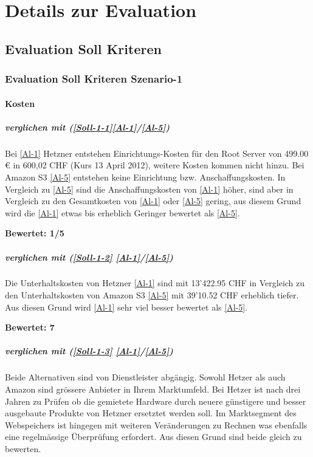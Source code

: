 \cleardoublepage
\chapter{Details zur Evaluation}
\section{Evaluation Soll Kriteren}
\subsection{Evaluation Soll Kriteren Szenario-1}

\subsubsection{Kosten}

\paragraph*{  verglichen mit  (\ref{Soll-1-1}\ref{Al-1}/\ref{Al-5})}
Bei \ref{Al-1} Hetzner entstehen Einrichtungs-Kosten für den Root Server von 499.00 € in 600,02 CHF (Kurs 13 April 2012), weitere Kosten kommen nicht hinzu. Bei Amazon S3 \ref{Al-5} entstehen keine Einrichtung bzw. Anschaffungskosten. In Vergleich zu \ref{Al-5} sind die Anschaffungskosten von \ref{Al-1} höher, sind aber in Vergleich zu den Gesamtkosten von \ref{Al-1} oder \ref{Al-5} gering, aus diesem Grund wird die \ref{Al-1} etwas bis erheblich Geringer bewertet als \ref{Al-5}.

\textbf{Bewertet: 1/5}

\paragraph*{  verglichen mit  (\ref{Soll-1-2} \ref{Al-1}/\ref{Al-5})}
Die Unterhaltskosten von Hetzner \ref{Al-1} sind mit 13'422.95 CHF in Vergleich zu den Unterhaltskosten von Amazon S3 \ref{Al-5} mit 39'10.52 CHF erheblich tiefer. Aus diesen Grund wird \ref{Al-1} sehr viel besser bewertet als \ref{Al-5}.

\textbf{Bewertet: 7}

\paragraph*{  verglichen mit  (\ref{Soll-1-3} \ref{Al-1}/\ref{Al-5})}
Beide Alternativen sind von Dienstleister abgängig. Sowohl Hetzer als auch Amazon sind grössere Anbieter in Ihrem Marktumfeld. Bei Hetzer ist nach drei Jahren zu Prüfen ob die gemietete Hardware durch neuere günstigere und besser ausgebaute Produkte von Hetzner ersetztet werden soll. Im Marktsegment des Webspeichers ist hingegen mit weiteren Veränderungen zu Rechnen was ebenfalls eine regelmässige Überprüfung erfordert. Aus diesen Grund sind beide gleich zu bewerten.


